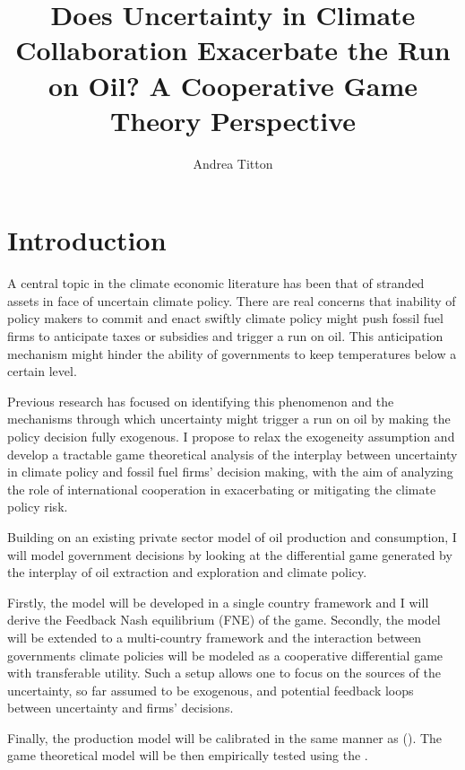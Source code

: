 \documentclass[american]{scrartcl}
\title{Does Uncertainty in Climate Collaboration Exacerbate the Run on Oil? A Cooperative Game Theory Perspective}
\author{Andrea Titton}
\newcommand{\citein}[1]{\citeauthor{#1} (\citeyear{#1})}
\begin{document}
\clearpage
\thispagestyle{empty}
\maketitle
\clearpage



\section{Introduction}

A central topic in the climate economic literature has been that of stranded assets in face of uncertain climate policy. There are real concerns that inability of policy makers to commit and enact swiftly climate policy might push fossil fuel firms to anticipate taxes or subsidies and trigger a run on oil. This anticipation mechanism might hinder the ability of governments to keep temperatures below a certain level.

Previous research has focused on identifying this phenomenon and the mechanisms through which uncertainty might trigger a run on oil by making the policy decision fully exogenous. I propose to relax the exogeneity assumption and develop a tractable game theoretical analysis of the interplay between uncertainty in climate policy and fossil fuel firms' decision making, with the aim of analyzing the role of international cooperation in exacerbating or mitigating the climate policy risk.

Building on an existing private sector model of oil production and consumption, I will model government decisions by looking at the differential game generated by the interplay of oil extraction and exploration and climate policy.

Firstly, the model will be developed in a single country framework and I will derive the Feedback Nash equilibrium (FNE) of the game. Secondly, the model will be extended to a multi-country framework and the interaction between governments climate policies will be modeled as a cooperative differential game with transferable utility. Such a setup allows one to focus on the sources of the uncertainty, so far assumed to be exogenous, and potential feedback loops between uncertainty and firms' decisions.

Finally, the production model will be calibrated in the same manner as \citein{Barnett2019}. The game theoretical model will be then empirically tested using the \citeauthor{Burck2020}.
\end{document}
